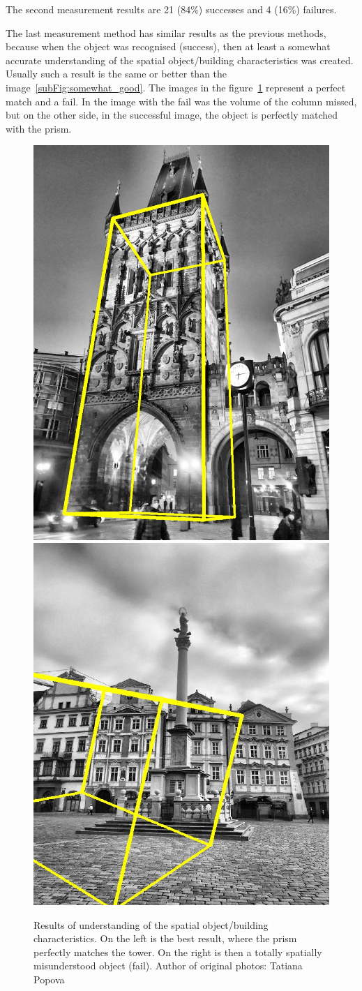 \documentclass[thesis=B,english]{FITthesis}[2019/12/23]
\begin{document}
                The second measurement results are 21 (84\%) successes and 4 (16\%) failures.
                
                The last measurement method has similar results as the previous methods, because when the object was recognised (success), then at least a somewhat accurate understanding of the spatial object/building characteristics was created. Usually such a result is the same or better than the image~\ref{subFig:somewhat_good}. The images in the figure~\ref{fig:prism_volume_matching} represent a perfect match and a fail. In the image with the fail was the volume of the column missed, but on the other side, in the successful image, the object is perfectly matched with the prism.
                
                \begin{figure}
                    \centering
                    \includegraphics[width = 0.39\linewidth, height = 0.52\linewidth]{pictures/tests/illustration/best_result.jpg}
                    \includegraphics[width = 0.39\linewidth, height = 0.52\linewidth]{pictures/tests/illustration/fail.jpg}
                    \caption[Results of understanding of the spatial object/building characteristics]{Results of understanding of the spatial object/building characteristics. On the left is the best result, where the prism perfectly matches the tower. On the right is then a totally spatially misunderstood object (fail). Author of original photos: Tatiana Popova}
                    \label{fig:prism_volume_matching}
                \end{figure}
                
\end{document}
